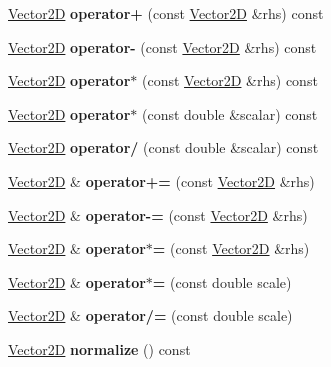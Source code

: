 \begin{DoxyCompactItemize}
\item 
\mbox{\label{class_vector2_d_a142a352f6cb2406fee15d153a275439c}} 
\hyperlink{class_vector2_d}{Vector2D} {\bfseries operator+} (const \hyperlink{class_vector2_d}{Vector2D} \&rhs) const
\item 
\mbox{\label{class_vector2_d_a803ee7e8cc2bfac23eb9e3aeebd5be3f}} 
\hyperlink{class_vector2_d}{Vector2D} {\bfseries operator-\/} (const \hyperlink{class_vector2_d}{Vector2D} \&rhs) const
\item 
\mbox{\label{class_vector2_d_a257aa1ca3260a4cacaa1171f67bf7910}} 
\hyperlink{class_vector2_d}{Vector2D} {\bfseries operator$\ast$} (const \hyperlink{class_vector2_d}{Vector2D} \&rhs) const
\item 
\mbox{\label{class_vector2_d_a7ade542889c8e483b5cc536b2bf4f053}} 
\hyperlink{class_vector2_d}{Vector2D} {\bfseries operator$\ast$} (const double \&scalar) const
\item 
\mbox{\label{class_vector2_d_adc10dc721432ed17e94602640bb24346}} 
\hyperlink{class_vector2_d}{Vector2D} {\bfseries operator/} (const double \&scalar) const
\item 
\mbox{\label{class_vector2_d_affc6e2a6034a4c4249a3e8b17f633069}} 
\hyperlink{class_vector2_d}{Vector2D} \& {\bfseries operator+=} (const \hyperlink{class_vector2_d}{Vector2D} \&rhs)
\item 
\mbox{\label{class_vector2_d_a16532303ee3e0a340f0515c1f0675fbd}} 
\hyperlink{class_vector2_d}{Vector2D} \& {\bfseries operator-\/=} (const \hyperlink{class_vector2_d}{Vector2D} \&rhs)
\item 
\mbox{\label{class_vector2_d_a7fe58ba3258641c02c7ea4499d42a089}} 
\hyperlink{class_vector2_d}{Vector2D} \& {\bfseries operator$\ast$=} (const \hyperlink{class_vector2_d}{Vector2D} \&rhs)
\item 
\mbox{\label{class_vector2_d_abd5d60f6e25137acab01b1d82da6819a}} 
\hyperlink{class_vector2_d}{Vector2D} \& {\bfseries operator$\ast$=} (const double scale)
\item 
\mbox{\label{class_vector2_d_a72a388dec12b808190830a35be86a1f7}} 
\hyperlink{class_vector2_d}{Vector2D} \& {\bfseries operator/=} (const double scale)
\item 
\mbox{\label{class_vector2_d_a79cfa577c38cb866d088166d6729a47d}} 
\hyperlink{class_vector2_d}{Vector2D} {\bfseries normalize} () const
\end{DoxyCompactItemize}
